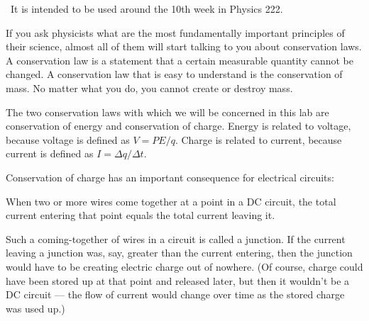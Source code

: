 \renewcommand\thechapter{c2.10}
\label{lab:kirchoff}

\covid\ 
It is intended to be used around the 10th week in Physics 222.

\apparatus
{}
\equip{replacement fuses for multimeter}


\introduction

If you ask physicists what are the most fundamentally
important principles of their science, almost all of them
will start talking to you about conservation laws. A
conservation law is a statement that a certain measurable
quantity cannot be changed. A conservation law that is easy
to understand is the conservation of mass. No matter what
you do, you cannot create or destroy mass.

The two conservation laws with which we will be concerned in
this lab are conservation of energy and conservation of
charge. Energy is related to voltage, because voltage is
defined as $V=PE/q$. Charge is related to current, because
current is defined as $I=\Delta q/\Delta t$.

Conservation of charge has an important consequence for
electrical circuits:

When two or more wires come together at a point in a DC circuit,
the total current entering that point equals the total current
leaving it.

Such a coming-together of wires in a circuit is called a
junction. If the current leaving a junction was, say,
greater than the current entering, then the junction would
have to be creating electric charge out of nowhere. (Of
course, charge could have been stored up at that point and
released later, but then it wouldn't be a DC circuit --- the
flow of current would change over time as the stored
charge was used up.)

